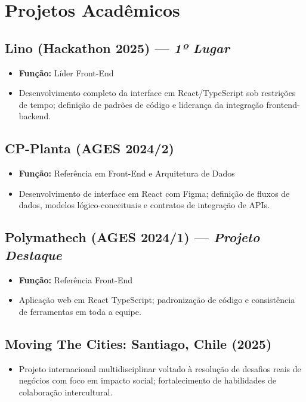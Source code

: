 \documentclass[a4paper,10pt]{article}
\begin{document}
\section*{Projetos Acadêmicos}

\subsection*{Lino (Hackathon 2025) --- \textit{1º Lugar}}
\begin{itemize}[leftmargin=1cm]
    \item \textbf{Função:} Líder Front-End
    \item Desenvolvimento completo da interface em React/TypeScript sob restrições de tempo; definição de padrões de código e liderança da integração frontend-backend.
\end{itemize}

\subsection*{CP-Planta (AGES 2024/2)}
\begin{itemize}[leftmargin=1cm]
    \item \textbf{Função:} Referência em Front-End e Arquitetura de Dados
    \item Desenvolvimento de interface em React com Figma; definição de fluxos de dados, modelos lógico-conceituais e contratos de integração de APIs.
\end{itemize}

\subsection*{Polymathech (AGES 2024/1) --- \textit{Projeto Destaque}}
\begin{itemize}[leftmargin=1cm]
    \item \textbf{Função:} Referência Front-End
    \item Aplicação web em React TypeScript; padronização de código e consistência de ferramentas em toda a equipe.
\end{itemize}

\subsection*{Moving The Cities: Santiago, Chile (2025)}
\begin{itemize}[leftmargin=1cm]
    \item Projeto internacional multidisciplinar voltado à resolução de desafios reais de negócios com foco em impacto social; fortalecimento de habilidades de colaboração intercultural.
\end{itemize}
\end{document}
